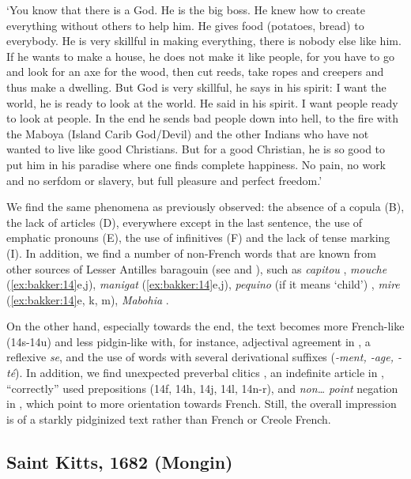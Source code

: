 \documentclass[output=paper,colorlinks,citecolor=brown]{langscibook}
\begin{document}
\glt `You know that there is a God. He is the big boss. He knew how to create everything without others to help him. He gives food (potatoes, bread) to everybody. He is very skillful in making everything, there is nobody else like him. If he wants to make a house, he does not make it like people, for you have to go and look for an axe for the wood, then cut reeds, take ropes and creepers and thus make a dwelling. But God is very skillful, he says in his spirit: I want the world, he is ready to look at the world. He said in his spirit. I want people ready to look at people. In the end he sends bad people down into hell, to the fire with the Maboya (Island Carib God/Devil) and the other Indians who have not wanted to live like good Christians. But for a good Christian, he is so good to put him in his paradise where one finds complete happiness. No pain, no work and no serfdom or slavery, but full pleasure and perfect freedom.'
\z
\z


We find the same phenomena as previously observed: the absence of a copula (B), the lack of articles (D), everywhere except in the last sentence, the use of emphatic pronouns (E), the use of infinitives (F) and the lack of tense marking (I). In addition, we find a number of non-French words that are known from other sources of Lesser Antilles baragouin (see \citealt{Jansen2012} and \citealt{Bakker2022}), such as \textit{capitou} , \textit{mouche }(\ref{ex:bakker:14}e,j), \textit{manigat} (\ref{ex:bakker:14}e,j), \textit{pequino} (if it means `child') , \textit{mire} (\ref{ex:bakker:14}e, k, m), \textit{Mabohia} .


On the other hand, especially towards the end, the text becomes more French-like (14s-14u) and less pidgin-like with, for instance, adjectival agreement in , a reflexive \textit{se}, and the use of words with several derivational suffixes (\textit{{}-ment, -age, -té}). In addition, we find unexpected preverbal clitics , an indefinite article in , “correctly” used prepositions (14f, 14h, 14j, 14l, 14n-r), and \textit{non… point} negation in , which point to more orientation towards French. Still, the overall impression is of a starkly pidginized text rather than French or Creole French.

\subsection{Saint Kitts, 1682 (Mongin)}\label{sec:bakker:3.4}
\end{document}
